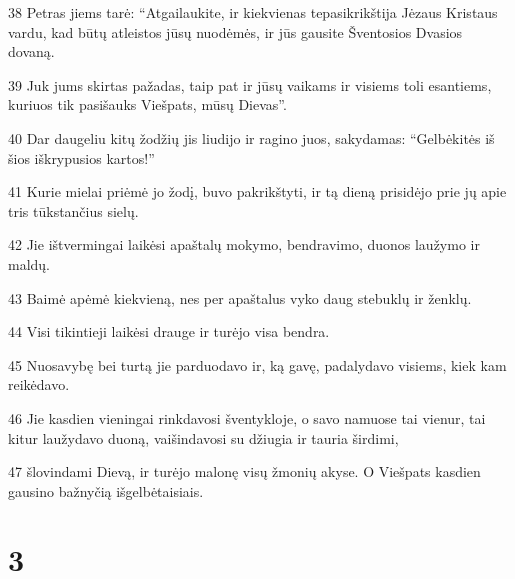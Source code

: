 \par 38 Petras jiems tarė: “Atgailaukite, ir kiekvienas tepasikrikštija Jėzaus Kristaus vardu, kad būtų atleistos jūsų nuodėmės, ir jūs gausite Šventosios Dvasios dovaną. 
\par 39 Juk jums skirtas pažadas, taip pat ir jūsų vaikams ir visiems toli esantiems, kuriuos tik pasišauks Viešpats, mūsų Dievas”. 
\par 40 Dar daugeliu kitų žodžių jis liudijo ir ragino juos, sakydamas: “Gelbėkitės iš šios iškrypusios kartos!” 
\par 41 Kurie mielai priėmė jo žodį, buvo pakrikštyti, ir tą dieną prisidėjo prie jų apie tris tūkstančius sielų. 
\par 42 Jie ištvermingai laikėsi apaštalų mokymo, bendravimo, duonos laužymo ir maldų. 
\par 43 Baimė apėmė kiekvieną, nes per apaštalus vyko daug stebuklų ir ženklų. 
\par 44 Visi tikintieji laikėsi drauge ir turėjo visa bendra. 
\par 45 Nuosavybę bei turtą jie parduodavo ir, ką gavę, padalydavo visiems, kiek kam reikėdavo. 
\par 46 Jie kasdien vieningai rinkdavosi šventykloje, o savo namuose tai vienur, tai kitur laužydavo duoną, vaišindavosi su džiugia ir tauria širdimi, 
\par 47 šlovindami Dievą, ir turėjo malonę visų žmonių akyse. O Viešpats kasdien gausino bažnyčią išgelbėtaisiais.


\chapter{3}


